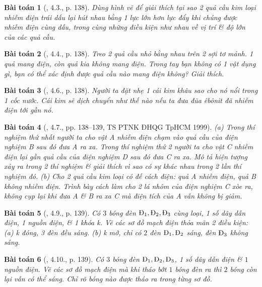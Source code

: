 \documentclass{article}
\newtheorem{baitoan}{Bài toán}
\begin{document}
\begin{baitoan}[\cite{Van_500_BT_Vat_Ly_THCS}, 4.3., p. 138]
	Dùng hình vẽ để giải thích tại sao 2 quả cầu kim loại nhiễm điện trái dấu lại hút nhau bằng 1 lực lớn hơn lực đẩy khi chúng được nhiễm điện cùng dấu, trong cùng những điều kiện như nhau về vị trí \& độ lớn của các quả cầu.
\end{baitoan}

\begin{baitoan}[\cite{Van_500_BT_Vat_Ly_THCS}, 4.4., p. 138]
	Treo 2 quả cầu nhỏ bằng nhau trên 2 sợi tơ mảnh. 1 quả mang điện, còn quả kia không mang điện. Trong tay bạn không có 1 vật dụng gì, bạn có thể xác định được quả cầu nào mang điện không? Giải thích.
\end{baitoan}

\begin{baitoan}[\cite{Van_500_BT_Vat_Ly_THCS}, 4.6., p. 138]
	Người ta đặt nhẹ 1 cái kim khâu sao cho nó nổi trong 1 cốc nước. Cái kim sẽ dịch chuyển như thế nào nếu ta đưa đũa êbônit đã nhiễm điện tới gần nó.
\end{baitoan}

\begin{baitoan}[\cite{Van_500_BT_Vat_Ly_THCS}, 4.7., pp. 138--139, TS PTNK ĐHQG TpHCM 1999]
	(a) Trong thí nghiệm thứ nhất người ta cho vật A nhiễm điện chạm vào quả cầu của điện nghiệm B sau đó đưa A ra xa. Trong thí nghiệm thứ 2 người ta cho vật C nhiễm điện lại gần quả cầu của điện nghiệm D sau đó đưa C ra xa. Mô tả hiện tượng xảy ra trong 2 thí nghiệm \& giải thích vì sao có sự khác nhau trong 2 lần thí nghiệm đó. (b) Cho 2 quả cầu kim loại có đế cách điện: quả A nhiễm điện, quả B không nhiễm điện. Trình bày cách làm cho 2 lá nhôm của điện nghiệm C xòe ra, không cụp lại khi đưa A \& B ra xa C mà điện tích của A vẫn không bị giảm.
\end{baitoan}

\begin{baitoan}[\cite{Van_500_BT_Vat_Ly_THCS}, 4.9., p. 139]
	Có $3$ bóng đèn $\rm\mbox{Đ}_1,\mbox{Đ}_2,\mbox{Đ}_3$ cùng loại, 1 số dây dẫn điện, 1 nguồn điện, \& 1 khóa k. Vẽ các sơ đồ mạch điện thỏa mãn 2 điều kiện: (a) k đóng, 3 đèn đều sáng. (b) k mở, chỉ có $2$ đèn $\rm\mbox{Đ}_1,\mbox{Đ}_2$ sáng, đèn $\rm\mbox{Đ}_3$ không sáng.
\end{baitoan}

\begin{baitoan}[\cite{Van_500_BT_Vat_Ly_THCS}, 4.10., p. 139]
	Có $3$ bóng đèn $\rm\mbox{Đ}_1,\mbox{Đ}_2,\mbox{Đ}_3$, 1 số dây dẫn điện \& $1$ nguồn điện. Vẽ các sơ đồ mạch điện mà khi tháo bớt $1$ bóng đèn ra thì $2$ bóng còn lại vẫn có thể sáng. Chỉ rõ bóng nào được tháo ra trong từng sơ đồ.
\end{baitoan}
\end{document}
